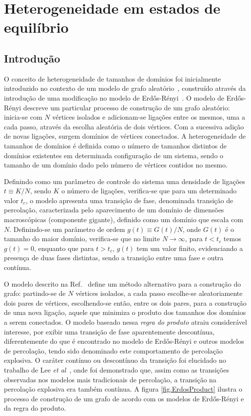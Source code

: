 \chapter{Heterogeneidade em estados de equilíbrio}
\label{cap.Heterogeneidade}

\section{Introdução}

O conceito de heterogeneidade de tamanhos de domínios foi inicialmente introduzido no contexto de um modelo de grafo aleatório~\cite{LeeKimPark}, construído através da introdução de uma modificação no modelo de Erdős-Rényi~\cite{Achlioptas}. O modelo de Erdős-Rényi descreve um particular processo de construção de um grafo aleatório: inicia-se com $N$ vértices isolados e adicionam-se ligações entre os mesmos, uma a cada passo, através da escolha aleatória de dois vértices. Com a sucessiva adição de novas ligações, surgem domínios de vértices conectados. A heterogeneidade de tamanhos de domínios é definida como o número de tamanhos distintos de domínios existentes em determinada configuração de um sistema, sendo o tamanho de um domínio dado pelo número de vértices contidos no mesmo.

Definindo como um parâmetro de controle do sistema uma densidade de ligações $t \equiv K/N$, sendo $K$ o número de ligações, verifica-se que para um determinado valor $t_c$, o modelo apresenta uma transição de fase, denominada transição de percolação, caracterizada pelo aparecimento de um domínio de dimensões macroscópicas (componente gigante), definido como um domínio que escala com $N$. Definindo-se um parâmetro de ordem $g(t) \equiv G(t)/N$, onde $G(t)$ é o tamanho do maior domínio, verifica-se que no limite $N \rightarrow \infty$, para $t < t_c$ temos $g(t)=0$, enquanto que para $t > t_c$, $g(t)$ tem um valor finito, evidenciando a presença de duas fases distintas, sendo a transição entre uma fase e outra contínua.

O modelo descrito na Ref.~\cite{Achlioptas} define um método alternativo para a construção do grafo: partindo-se de $N$ vértices isolados, a cada passo escolhe-se aleatoriamente dois pares de vértices, escolhendo-se então, entre os dois pares, para a construção de uma nova ligação, aquele que minimiza o produto dos tamanhos dos domínios a serem conectados. O modelo baseado nessa \textit{regra do produto} atraiu considerável interesse, por exibir uma transição de fase aparentemente descontínua, diferentemente do que é encontrado no modelo de Erdős-Rényi e outros modelos de percolação, tendo sido denominado este comportamento de percolação explosiva. O caráter contínuo ou descontínuo da transição foi elucidado no trabalho de Lee \textit{et al}~\cite{LeeKimPark}, onde foi demonstrado que, assim como as transições observadas nos modelos mais tradicionais de percolação, a transição na percolação explosiva era também contínua. A figura \ref{fig.ErdosProduct} ilustra o processo de construção de um grafo de acordo com os modelos de Erdős-Rényi e da regra do produto.

